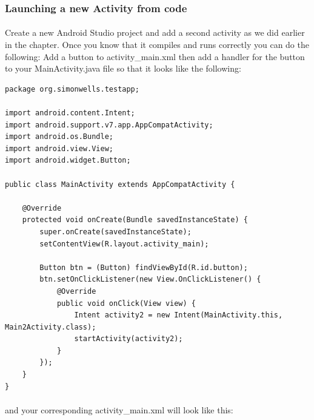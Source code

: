 \subsubsection{Launching a new Activity from code}
\paragraph{} Create a new Android Studio project and add a second activity as we did earlier in the chapter. Once you know that it compiles and runs correctly you can do the following: Add a button to activity\_main.xml then add a handler for the button to your MainActivity.java file so that it looks like the following:

\begin{lstlisting}
package org.simonwells.testapp;

import android.content.Intent;
import android.support.v7.app.AppCompatActivity;
import android.os.Bundle;
import android.view.View;
import android.widget.Button;

public class MainActivity extends AppCompatActivity {

    @Override
    protected void onCreate(Bundle savedInstanceState) {
        super.onCreate(savedInstanceState);
        setContentView(R.layout.activity_main);

        Button btn = (Button) findViewById(R.id.button);
        btn.setOnClickListener(new View.OnClickListener() {
            @Override
            public void onClick(View view) {
                Intent activity2 = new Intent(MainActivity.this, Main2Activity.class);
                startActivity(activity2);
            }
        });
    }
}
\end{lstlisting}

\paragraph{} and your corresponding activity\_main.xml will look like this:

